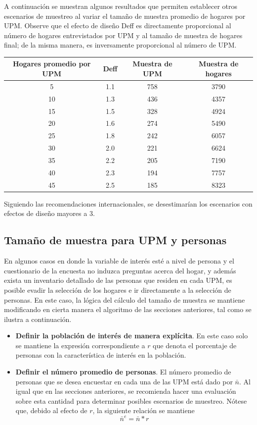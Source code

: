 \documentclass[
  10pt,
  spanish,
]{book}
\begin{document}
A continuación se muestran algunos resultados que permiten establecer otros escenarios de muestreo al variar el tamaño de muestra promedio de hogares por UPM. Observe que el efecto de diseño Deff es directamente proporcional al número de hogares entrevistados por UPM y al tamaño de muestra de hogares final; de la misma manera, es inversamente proporcional al número de UPM.

\begin{longtable}[]{@{}cccc@{}}
\toprule
Hogares promedio por UPM & Deff & Muestra de UPM & Muestra de hogares \\
\midrule
\endhead
5 & 1.1 & 758 & 3790 \\
10 & 1.3 & 436 & 4357 \\
15 & 1.5 & 328 & 4924 \\
20 & 1.6 & 274 & 5490 \\
25 & 1.8 & 242 & 6057 \\
30 & 2.0 & 221 & 6624 \\
35 & 2.2 & 205 & 7190 \\
40 & 2.3 & 194 & 7757 \\
45 & 2.5 & 185 & 8323 \\
\bottomrule
\end{longtable}

Siguiendo las recomendaciones internacionales, se desestimarían los escenarios con efectos de diseño mayores a 3.

\hypertarget{tamauxf1o-de-muestra-para-upm-y-personas}{%
\subsection{Tamaño de muestra para UPM y personas}\label{tamauxf1o-de-muestra-para-upm-y-personas}}

En algunos casos en donde la variable de interés esté a nivel de persona y el cuestionario de la encuesta no induzca preguntas acerca del hogar, y además exista un inventario detallado de las personas que residen en cada UPM, es posible evadir la selección de los hogares e ir directamente a la selección de personas. En este caso, la lógica del cálculo del tamaño de muestra se mantiene modificando en cierta manera el algoritmo de las secciones anteriores, tal como se ilustra a continuación.

\begin{itemize}
\item
  \textbf{Definir la población de interés de manera explícita}. En este caso solo se mantiene la expresión correspondiente a \(r\) que denota el porcentaje de personas con la característica de interés en la población.
\item
  \textbf{Definir el número promedio de personas}. El número promedio de personas que se desea encuestar en cada una de las UPM está dado por \(\bar{n}\). Al igual que en las secciones anteriores, se recomienda hacer una evaluación sobre esta cantidad para determinar posibles escenarios de muestreo. Nótese que, debido al efecto de \(r\), la siguiente relación se mantiene
  \[
  \bar{n}^e = \bar{n} * r
  \]
\end{itemize}
\end{document}
